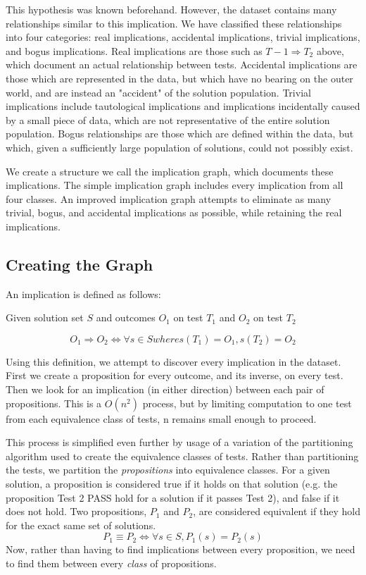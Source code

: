 \documentclass[11pt,twoside]{article}
\theoremstyle{definition}
\begin{document}
This hypothesis was known beforehand. However, the dataset contains many relationships similar to this implication. We have classified these relationships into four categories: real implications, accidental implications, trivial implications, and bogus implications. Real implications are those such as $T-1 \Rightarrow T_2$ above, which document an actual relationship between tests. Accidental implications are those which are represented in the data, but which have no bearing on the outer world, and are instead an "accident" of the solution population. Trivial implications include tautological implications and implications incidentally caused by a small piece of data, which are not representative of the entire solution population. Bogus relationships are those which are defined within the data, but which, given a sufficiently large population of solutions, could not possibly exist.

We create a structure we call the implication graph, which documents these implications. The simple implication graph includes every implication from all four classes. An improved implication graph attempts to eliminate as many trivial, bogus, and accidental implications as possible, while retaining the real implications.

\subsection{Creating the Graph}
An implication is defined as follows:

\centerline{Given solution set $S$ and outcomes $O_1$ on test $T_1$ and $O_2$ on test $T_2$}
$$O_1 \Rightarrow O_2 \iff \forall s \in S where s(T_1) = O_1, s(T_2) = O_2$$

Using this definition, we attempt to discover every implication in the dataset. First we create a proposition for every outcome, and its inverse, on every test. Then we look for an implication (in either direction) between each pair of propositions. This is a $O(n^2)$ process, but by limiting computation to one test from each equivalence class of tests, n remains small enough to proceed.

This process is simplified even further by usage of a variation of the partitioning algorithm used to create the equivalence classes of tests. Rather than partitioning the tests, we partition the \emph{propositions} into equivalence classes. For a given solution, a proposition is considered true if it holds on that solution (e.g. the proposition Test 2 PASS hold for a solution if it passes Test 2), and false if it does not hold. Two propositions, $P_1$ and $P_2$, are considered equivalent if they hold for the exact same set of solutions.
$$P_1 \equiv P_2 \iff \forall s \in S, P_1(s) = P_2(s)$$
Now, rather than having to find implications between every proposition, we need to find them between every \emph{class} of propositions.
\end{document}
